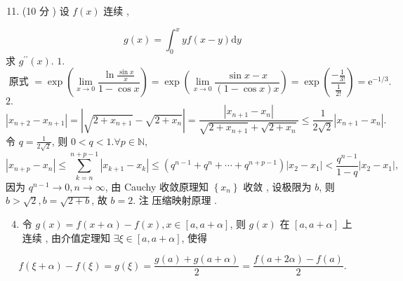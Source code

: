 \documentclass[10pt]{article}
\begin{document}
\begin{enumerate}
  \setcounter{enumi}{10}
  \item (10  分 )  设  $f(x)$  连续 ,
\end{enumerate}
$$
g(x)=\int_{0}^{x} y f(x-y) \mathrm{d} y
$$
 求  $g^{\prime \prime}(x)$. $1 .$
$$
\text { 原式 }=\exp \left(\lim _{x \rightarrow 0} \frac{\ln \frac{\sin x}{x}}{1-\cos x}\right)=\exp \left(\lim _{x \rightarrow 0} \frac{\sin x-x}{(1-\cos x) x}\right)=\exp \left(\frac{-\frac{1}{3 !}}{\frac{1}{2 !}}\right)=\mathrm{e}^{-1 / 3} \text {. }
$$
$2 .$
$$
\left|x_{n+2}-x_{n+1}\right|=\left|\sqrt{2+x_{n+1}}-\sqrt{2+x_{n}}\right|=\frac{\left|x_{n+1}-x_{n}\right|}{\sqrt{2+x_{n+1}}+\sqrt{2+x_{n}}} \leqslant \frac{1}{2 \sqrt{2}}\left|x_{n+1}-x_{n}\right| .
$$
 令  $q=\frac{1}{2 \sqrt{2}}$,  则  $0<q<1 . \forall p \in \mathbb{N}$,
$$
\left|x_{n+p}-x_{n}\right| \leqslant \sum_{k=n}^{n+p-1}\left|x_{k+1}-x_{k}\right| \leqslant\left(q^{n-1}+q^{n}+\cdots+q^{n+p-1}\right)\left|x_{2}-x_{1}\right|<\frac{q^{n-1}}{1-q}\left|x_{2}-x_{1}\right|,
$$
 因为  $q^{n-1} \rightarrow 0, n \rightarrow \infty$,  由  Cauchy  收敛原理知  $\left\{x_{n}\right\}$  收敛 ,  设极限为  $b$,  则  $b>\sqrt{2}, b=\sqrt{2+b}$,  故  $b=2$.  注   压缩映射原理 .

\begin{enumerate}
  \setcounter{enumi}{3}
  \item  令  $g(x)=f(x+\alpha)-f(x), x \in[a, a+\alpha]$,  则  $g(x)$  在  $[a, a+\alpha]$  上连续 ,  由介值定理知  $\exists \xi \in[a, a+\alpha]$,  使得 
\end{enumerate}
$$
f(\xi+\alpha)-f(\xi)=g(\xi)=\frac{g(a)+g(a+\alpha)}{2}=\frac{f(a+2 \alpha)-f(a)}{2} .
$$
\end{document}

